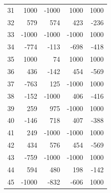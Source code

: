 \begin{table}[p]
\begin{tabular}{r r r r r}
31 & 1000 & -1000 & 1000 & 1000\\
32 & 579 & 574 & 423 & -236\\
33 & -1000 & -1000 & -1000 & 1000\\
\midrule
34 & -774 & -113 & -698 & -418\\
35 & 1000 & 74 & 1000 & 1000\\
36 & 436 & -142 & 454 & -569\\
37 & -763 & 125 & -1000 & 1000\\
38 & -152 & -1000 & 406 & -416\\
39 & 259 & 975 & -1000 & 1000\\
40 & -146 & 718 & 407 & -388\\
41 & 249 & -1000 & -1000 & 1000\\
42 & 434 & 576 & 454 & -569\\
43 & -759 & -1000 & -1000 & 1000\\
44 & 594 & 480 & 198 & -142\\
45 & -1000 & -832 & -606 & 1000\\
\bottomrule\end{tabular}
\end{table}
